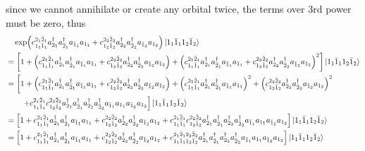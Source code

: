 \documentclass[a4paper]{article}
\numberwithin{equation}{subsection}
\begin{document}
since we cannot annihilate or create any orbital twice, the terms over 3rd power must be zero, thus
\begin{align}
& \quad \exp(c_{1_1 \bar{1}_1}^{2_1 \bar{2}_1} a^\dagger_{2_1}a^\dagger_{\bar{2}_1} a_{\bar{1}_1}a_{1_1} + c_{1_2 \bar{1}_2}^{2_2 \bar{2}_2} a^\dagger_{2_2}a^\dagger_{\bar{2}_2} a_{\bar{1}_2}a_{1_2}
) \ket{1_1 \bar{1}_1 1_2 \bar{1}_2} \notag\\
&= \qty[ 1 
+ \qty(c_{1_1 \bar{1}_1}^{2_1 \bar{2}_1} a^\dagger_{2_1}a^\dagger_{\bar{2}_1} a_{\bar{1}_1}a_{1_1} + c_{1_2 \bar{1}_2}^{2_2 \bar{2}_2} a^\dagger_{2_2}a^\dagger_{\bar{2}_2} a_{\bar{1}_2}a_{1_2}) 
+ \qty(c_{1_1 \bar{1}_1}^{2_1 \bar{2}_1} a^\dagger_{2_1}a^\dagger_{\bar{2}_1} a_{\bar{1}_1}a_{1_1} + c_{1_2 \bar{1}_2}^{2_2 \bar{2}_2} a^\dagger_{2_2}a^\dagger_{\bar{2}_2} a_{\bar{1}_2}a_{1_2})^2
] \ket{1_1 \bar{1}_1 1_2 \bar{1}_2} \notag\\
&= \left[ 1 
+ \qty(c_{1_1 \bar{1}_1}^{2_1 \bar{2}_1} a^\dagger_{2_1}a^\dagger_{\bar{2}_1} a_{\bar{1}_1}a_{1_1} + c_{1_2 \bar{1}_2}^{2_2 \bar{2}_2} a^\dagger_{2_2}a^\dagger_{\bar{2}_2} a_{\bar{1}_2}a_{1_2}) 
  + \qty(c_{1_1 \bar{1}_1}^{2_1 \bar{2}_1} a^\dagger_{2_1}a^\dagger_{\bar{2}_1} a_{\bar{1}_1}a_{1_1})^2 
  + \qty(c_{1_2 \bar{1}_2}^{2_2 \bar{2}_2} a^\dagger_{2_2}a^\dagger_{\bar{2}_2} a_{\bar{1}_2}a_{1_2})^2 \right. \notag\\
&{} \qquad \left.
  + c_{1_1 \bar{1}_1}^{2_1 \bar{2}_1}c_{1_2 \bar{1}_2}^{2_2 \bar{2}_2} a^\dagger_{2_1}a^\dagger_{\bar{2}_1} a^\dagger_{2_2}a^\dagger_{\bar{2}_2} a_{\bar{1}_1}a_{1_1}  a_{\bar{1}_2}a_{1_2}
\right] \ket{1_1 \bar{1}_1 1_2 \bar{1}_2} \notag\\
&= \qty[1 
+ c_{1_1 \bar{1}_1}^{2_1 \bar{2}_1} a^\dagger_{2_1}a^\dagger_{\bar{2}_1} a_{\bar{1}_1}a_{1_1} 
+ c_{1_2 \bar{1}_2}^{2_2 \bar{2}_2} a^\dagger_{2_2}a^\dagger_{\bar{2}_2} a_{\bar{1}_2}a_{1_2}
+ c_{1_1 \bar{1}_1}^{2_1 \bar{2}_1}c_{1_2 \bar{1}_2}^{2_2 \bar{2}_2} a^\dagger_{2_1}a^\dagger_{\bar{2}_1} a^\dagger_{2_2}a^\dagger_{\bar{2}_2} a_{\bar{1}_1}a_{1_1}  a_{\bar{1}_2}a_{1_2} 
] \ket{1_1 \bar{1}_1 1_2 \bar{1}_2} \notag\\
&= \qty[1 
+ c_{1_1 \bar{1}_1}^{2_1 \bar{2}_1} a^\dagger_{2_1}a^\dagger_{\bar{2}_1} a_{\bar{1}_1}a_{1_1} 
+ c_{1_2 \bar{1}_2}^{2_2 \bar{2}_2} a^\dagger_{2_2}a^\dagger_{\bar{2}_2} a_{\bar{1}_2}a_{1_2}
+ c_{1_1 \bar{1}_1 1_2 \bar{1}_2}^{2_1 \bar{2}_1 2_2 \bar{2}_2}  a^\dagger_{2_1}a^\dagger_{\bar{2}_1} a^\dagger_{2_2}a^\dagger_{\bar{2}_2} a_{\bar{1}_1}a_{1_1}  a_{\bar{1}_2}a_{1_2} 
] \ket{1_1 \bar{1}_1 1_2 \bar{1}_2} 
\end{align}
\end{document}
